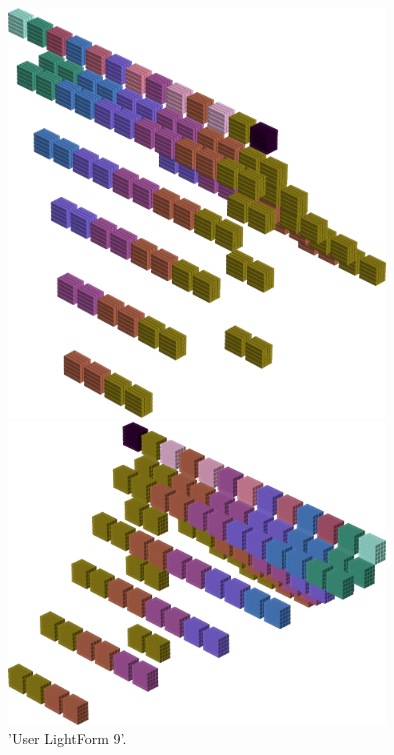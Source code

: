 \begin{figure}[H]
    \centering
    \begin{adjustbox}{width=10cm,center}
      \includegraphics[width=10cm]{src/colorspace_patterns/pattern17-45.png}%
    \end{adjustbox}
    \begin{adjustbox}{width=10cm}
      \includegraphics[width=10cm]{src/colorspace_patterns/pattern17-225.png}%
    \end{adjustbox}
\caption{'User LightForm 9'.}
\end{figure}
\clearpage

